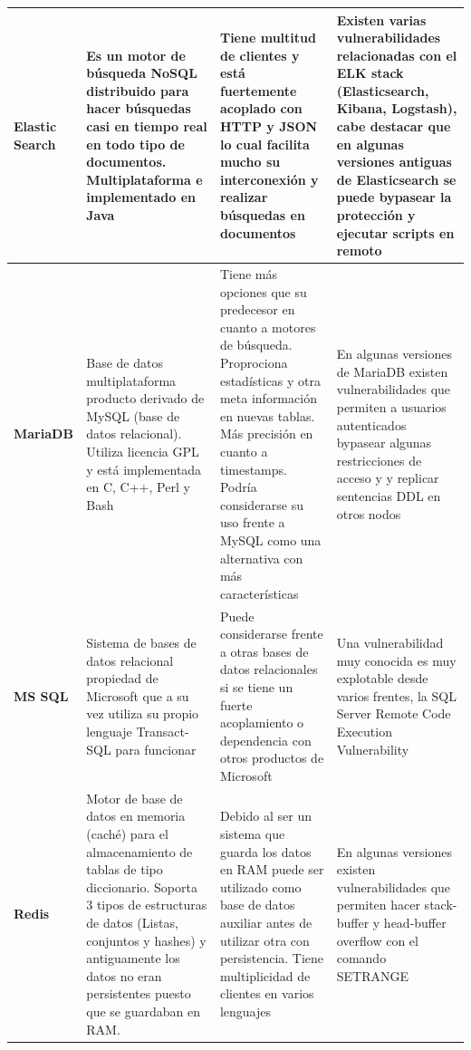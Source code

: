 \documentclass[10pt,a4paper]{article}
\begin{document}
\begin{tabularx}{\textwidth}{|X|X|X|X|}
\textbf{Elastic Search} & Es un motor de búsqueda NoSQL distribuido para hacer búsquedas casi en tiempo real en todo tipo de documentos. Multiplataforma e implementado en Java & Tiene multitud de clientes y está fuertemente acoplado con HTTP y JSON lo cual facilita mucho su interconexión y realizar búsquedas en documentos & Existen varias vulnerabilidades relacionadas con el ELK stack (Elasticsearch, Kibana, Logstash), cabe destacar que en algunas versiones antiguas de Elasticsearch se puede bypasear la protección y ejecutar scripts en remoto \cite{elasticsec} \\ \hline

\textbf{MariaDB} & Base de datos multiplataforma producto derivado de MySQL (base de datos relacional). Utiliza licencia GPL y está implementada en C, C++, Perl y Bash & Tiene más opciones que su predecesor en cuanto a motores de búsqueda. Proprociona estadísticas y otra meta información en nuevas tablas. Más precisión en cuanto a timestamps. Podría considerarse su uso frente a MySQL como una alternativa con más características & En algunas versiones de MariaDB existen vulnerabilidades que permiten a usuarios autenticados bypasear algunas restricciones de acceso y y replicar sentencias DDL en otros nodos \cite{mariadbsec} \\ \hline

\textbf{MS SQL} & Sistema de bases de datos relacional propiedad de Microsoft que a su vez utiliza su propio lenguaje Transact-SQL para funcionar & Puede considerarse frente a otras bases de datos relacionales si se tiene un fuerte acoplamiento o dependencia con otros productos de Microsoft & Una vulnerabilidad muy conocida es muy explotable desde varios frentes, la SQL Server Remote Code Execution Vulnerability \cite{mssqlsec}\\ \hline

\textbf{Redis} & Motor de base de datos en memoria (caché) para el almacenamiento de tablas de tipo diccionario. Soporta 3 tipos de estructuras de datos (Listas, conjuntos y hashes) y antiguamente los datos no eran persistentes puesto que se guardaban en RAM. & Debido al ser un sistema que guarda los datos en RAM puede ser utilizado como base de datos auxiliar antes de utilizar otra con persistencia. Tiene multiplicidad de clientes en varios lenguajes & En algunas versiones existen vulnerabilidades que permiten hacer stack-buffer y head-buffer overflow con el comando SETRANGE \cite{redissec}
\\ \hline


\end{tabularx}
\end{document}
